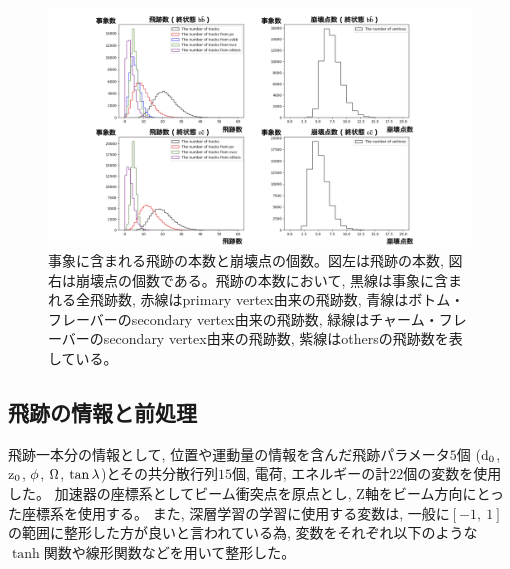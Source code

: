 \begin{figure}[htbp]
 \centering
 \includegraphics[trim = 150 0 150 0, width=1.0\textwidth, clip]{Figure/3Networks/3-1-1-2TracksandVertices.png}
 \caption[事象に含まれる飛跡の本数と崩壊点の個数]{事象に含まれる飛跡の本数と崩壊点の個数。図左は飛跡の本数, 図右は崩壊点の個数である。飛跡の本数において, 黒線は事象に含まれる全飛跡数, 赤線はprimary vertex由来の飛跡数, 青線はボトム・フレーバーのsecondary vertex由来の飛跡数, 緑線はチャーム・フレーバーのsecondary vertex由来の飛跡数, 紫線はothersの飛跡数を表している。}
 \label{3-1-1-2TracksandVertices}
\end{figure}


\subsection{飛跡の情報と前処理} \label{Net:Data:TrackInformationandPreprocessing}

飛跡一本分の情報として, 位置や運動量の情報を含んだ飛跡パラメータ$5$個 ($\rm d_0$, $\rm z_0$, $\rm \phi$, $\rm \Omega$, $\rm \tan{\lambda}$)\cite{TrackParametersLCIO}とその共分散行列$15$個, 電荷, エネルギーの計$22$個の変数を使用した。
加速器の座標系としてビーム衝突点を原点とし, Z軸をビーム方向にとった座標系を使用する。
また, 深層学習の学習に使用する変数は, 一般に$[-1,\ 1]$の範囲に整形した方が良いと言われている為, 変数をそれぞれ以下のような$\tanh$関数や線形関数などを用いて整形した。

